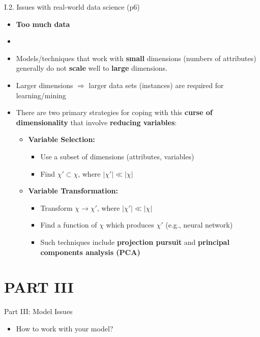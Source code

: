 \documentclass[handout]{beamer}
\newcommand{\strong}[1]{\textbf{\color{teal} #1}}
\newcommand{\stronger}[1]{\textbf{\color{purple} #1}}
\begin{document}
\begin{frame}{I.2. Issues with real-world data science (p6)}
\begin{itemize}
\item[] \strong{Too much data}
\item[]
\item Models/techniques that work with \strong{small} dimensions (numbers of attributes) generally do not \strong{scale} well to \strong{large} dimensions.
\item Larger dimensions $\Rightarrow$ larger data sets (instances) are required for learning/mining
\item There are two primary strategies for coping with this \stronger{curse of dimensionality} that involve \strong{reducing variables}:
	\begin{itemize}
	\item[(1)] \stronger{Variable Selection:} 
		\begin{itemize}
		\item Use a subset of dimensions (attributes, variables)
		\item Find $\chi' \subset \chi$, where $|\chi'| \ll |\chi|$
		\end{itemize}
	\item[(2)] \stronger{Variable Transformation:}
		\begin{itemize}
		\item Transform $\chi \rightarrow \chi'$, where $|\chi'| \ll |\chi|$
		\item Find a function of $\chi$ which produces $\chi'$ (e.g., neural network)
		\item Such techniques include \stronger{projection pursuit} and \stronger{principal components analysis (PCA)}
		\end{itemize}
	\end{itemize}
\end{itemize}
\end{frame}



\section{PART III}
\begin{frame}{Part III: Model Issues}
\begin{itemize}
\item How to work with your model?
\end{itemize}
\end{frame}
\end{document}

